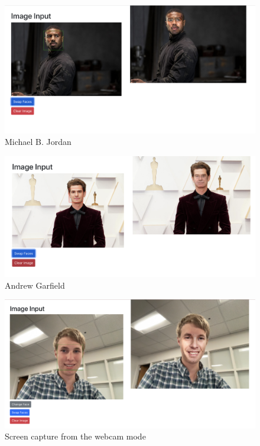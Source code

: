 \begin{figure}[t]
    \centering
    \includegraphics[width=\linewidth]{michael_b_jordan_result.png}
    \caption{Michael B. Jordan}
    \label{fig:result3}
\end{figure}

\begin{figure}[t]
    \centering
    \includegraphics[width=\linewidth]{andrew_garfield_result.png}
    \caption{Andrew Garfield}
    \label{fig:result4}
\end{figure}

\begin{figure}[t]
    \centering
    \includegraphics[width=\linewidth]{Screenshot_2022-05-09 16.14.04.png}
    \caption{Screen capture from the webcam mode}
    \label{fig:result5}
\end{figure}

